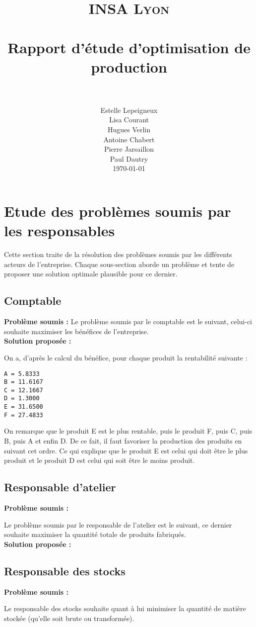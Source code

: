 \documentclass[paper=a4, fontsize=11pt]{scrartcl}
\title{
		\usefont{OT1}{bch}{b}{n}
		\normalfont \normalsize \textsc{INSA Lyon} \\ [25pt]
		\horrule{0.5pt} \\[0.4cm]
		\huge Rapport d'étude d'optimisation de production \\
		\horrule{2pt} \\[0.5cm]
}
\author{
		\normalfont 								\normalsize
        Estelle Lepeigneux\\[-3pt]		\normalsize
		Lisa Courant\\[-3pt]		\normalsize
		Hugues Verlin\\[-3pt]		\normalsize
		Antoine Chabert\\[-3pt]		\normalsize
		Pierre Jarsaillon\\[-3pt]		\normalsize
		Paul Dautry\\[-3pt]		\normalsize
        \today
}
\date{}
\numberwithin{equation}{section}		%
\numberwithin{figure}{section}			%
\numberwithin{table}{section}				%
\renewcommand{\bf}[1]{\textbf{#1}}
\begin{document}
\maketitle
\section{Etude des problèmes soumis par les responsables}
Cette section traite de la résolution des problèmes soumis par les différents acteurs de l'entreprise. Chaque sous-section aborde un problème et tente de proposer une solution optimale plausible pour ce dernier.

\subsection{Comptable}
\bf{Problème soumis :}
Le problème soumis par le comptable est le suivant, celui-ci souhaite maximiser les bénéfices de l'entreprise.\\

\bf{Solution proposée :}

On a, d’après le calcul du bénéfice, pour chaque produit la rentabilité suivante :
\begin{verbatim}
A = 5.8333
B = 11.6167
C = 12.1667
D = 1.3000
E = 31.6500
F = 27.4833
\end{verbatim}
On remarque que le produit E est le plus rentable, puis le produit F, puis C, puis B, puis A et enfin D. De ce fait, il faut favoriser la production des produits en suivant cet ordre. Ce qui explique que le produit E est celui qui doit être le plus produit et le produit D est celui qui soit être le moins produit.

\subsection{Responsable d'atelier}
\bf{Problème soumis :}

Le problème soumis par le responsable de l'atelier est le suivant, ce dernier souhaite maximiser la quantité totale de produits fabriqués.\\

\bf{Solution proposée :}

\subsection{Responsable des stocks}
\bf{Problème soumis :}

Le responsable des stocks souhaite quant à lui minimiser la quantité de matière stockée (qu'elle soit brute ou transformée).\\
\end{document}
